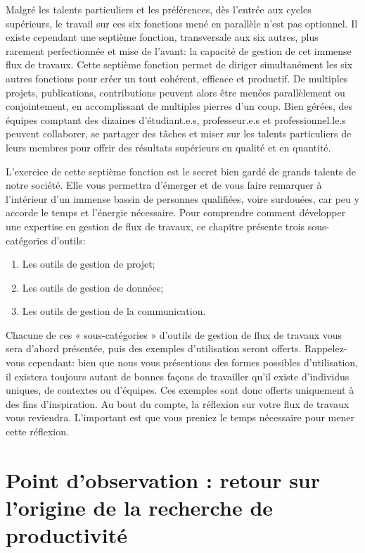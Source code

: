 \documentclass[
  letterpaper,
  DIV=11,
  numbers=noendperiod]{scrreprt}
\providecommand{\tightlist}{%
  \setlength{\itemsep}{0pt}\setlength{\parskip}{0pt}}\usepackage{longtable,booktabs,array}
\begin{document}
Malgré les talents particuliers et les préférences, dès l'entrée aux
cycles supérieurs, le travail sur ces six fonctions mené en parallèle
n'est pas optionnel. Il existe cependant une septième fonction,
transversale aux six autres, plus rarement perfectionnée et mise de
l'avant: la capacité de gestion de cet immense flux de travaux. Cette
septième fonction permet de diriger simultanément les six autres
fonctions pour créer un tout cohérent, efficace et productif. De
multiples projets, publications, contributions peuvent alors être menées
parallèlement ou conjointement, en accomplissant de multiples pierres
d'un coup. Bien gérées, des équipes comptant des dizaines
d'étudiant.e.s, professeur.e.s et professionnel.le.s peuvent collaborer,
se partager des tâches et miser sur les talents particuliers de leurs
membres pour offrir des résultats supérieurs en qualité et en quantité.

L'exercice de cette septième fonction est le secret bien gardé de grands
talents de notre société. Elle vous permettra d'émerger et de vous faire
remarquer à l'intérieur d'un immense bassin de personnes qualifiées,
voire surdouées, car peu y accorde le temps et l'énergie nécessaire.
Pour comprendre comment développer une expertise en gestion de flux de
travaux, ce chapitre présente trois sous-catégories d'outils:

\begin{enumerate}
\def\labelenumi{\arabic{enumi}.}
\tightlist
\item
  Les outils de gestion de projet;
\item
  Les outils de gestion de données;
\item
  Les outils de gestion de la communication.
\end{enumerate}

Chacune de ces « sous-catégories » d'outils de gestion de flux de
travaux vous sera d'abord présentée, puis des exemples d'utilisation
seront offerts. Rappelez-vous cependant: bien que nous vous présentions
des formes possibles d'utilisation, il existera toujours autant de
bonnes façons de travailler qu'il existe d'individus uniques, de
contextes ou d'équipes. Ces exemples sont donc offerts uniquement à des
fins d'inspiration. Au bout du compte, la réflexion sur votre flux de
travaux vous reviendra. L'important est que vous preniez le temps
nécessaire pour mener cette réflexion.

\section{Point d'observation : retour sur l'origine de la recherche de
productivité}\label{point-dobservation-retour-sur-lorigine-de-la-recherche-de-productivituxe9}
\end{document}
